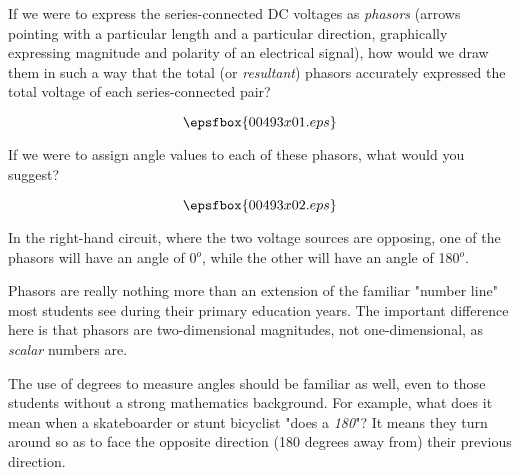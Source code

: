 

If we were to express the series-connected DC voltages as {\it phasors} (arrows pointing with a particular length and a particular direction, graphically expressing magnitude and polarity of an electrical signal), how would we draw them in such a way that the total (or {\it resultant}) phasors accurately expressed the total voltage of each series-connected pair?

$$\epsfbox{00493x01.eps}$$

If we were to assign angle values to each of these phasors, what would you suggest?







$$\epsfbox{00493x02.eps}$$

In the right-hand circuit, where the two voltage sources are opposing, one of the phasors will have an angle of 0$^{o}$, while the other will have an angle of 180$^{o}$.







Phasors are really nothing more than an extension of the familiar "number line" most students see during their primary education years.  The important difference here is that phasors are two-dimensional magnitudes, not one-dimensional, as {\it scalar} numbers are.

The use of degrees to measure angles should be familiar as well, even to those students without a strong mathematics background.  For example, what does it mean when a skateboarder or stunt bicyclist "does a {\it 180}"?  It means they turn around so as to face the opposite direction (180 degrees away from) their previous direction.




